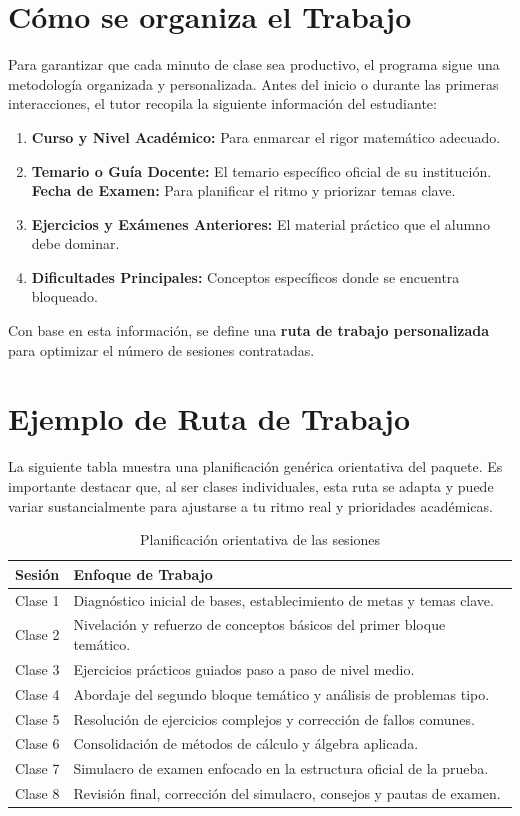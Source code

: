\documentclass[11pt,a4paper]{article}
\begin{document}
\section{Cómo se organiza el Trabajo}
Para garantizar que cada minuto de clase sea productivo, el programa sigue una metodología organizada y personalizada. Antes del inicio o durante las primeras interacciones, el tutor recopila la siguiente información del estudiante:
\begin{enumerate}
    \item \textbf{Curso y Nivel Académico:} Para enmarcar el rigor matemático adecuado.
    \item \textbf{Temario o Guía Docente:} El temario específico oficial de su institución.
    \textbf{Fecha de Examen:} Para planificar el ritmo y priorizar temas clave.
    \item \textbf{Ejercicios y Exámenes Anteriores:} El material práctico que el alumno debe dominar.
    \item \textbf{Dificultades Principales:} Conceptos específicos donde se encuentra bloqueado.
\end{enumerate}
Con base en esta información, se define una \textbf{ruta de trabajo personalizada} para optimizar el número de sesiones contratadas.

\section{Ejemplo de Ruta de Trabajo}
La siguiente tabla muestra una planificación genérica orientativa del paquete. Es importante destacar que, al ser clases individuales, esta ruta se adapta y puede variar sustancialmente para ajustarse a tu ritmo real y prioridades académicas.

\begin{table}[h]
\centering
\renewcommand{\arraystretch}{1.3}
\begin{tabular}{|l|p{11cm}|}
\hline
\rowcolor{primary}
\color{white}\textbf{Sesión} & \color{white}\textbf{Enfoque de Trabajo} \\ \hline
 Clase 1 & Diagnóstico inicial de bases, establecimiento de metas y temas clave. \\ \hline
 Clase 2 & Nivelación y refuerzo de conceptos básicos del primer bloque temático. \\ \hline
 Clase 3 & Ejercicios prácticos guiados paso a paso de nivel medio. \\ \hline
 Clase 4 & Abordaje del segundo bloque temático y análisis de problemas tipo. \\ \hline
 Clase 5 & Resolución de ejercicios complejos y corrección de fallos comunes. \\ \hline
 Clase 6 & Consolidación de métodos de cálculo y álgebra aplicada. \\ \hline
 Clase 7 & Simulacro de examen enfocado en la estructura oficial de la prueba. \\ \hline
 Clase 8 & Revisión final, corrección del simulacro, consejos y pautas de examen. \\ \hline
\end{tabular}
\caption{Planificación orientativa de las sesiones}
\end{table}
\end{document}
